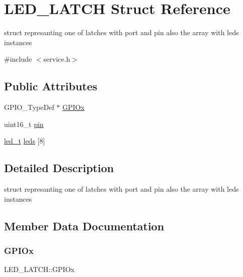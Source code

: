 \hypertarget{struct_l_e_d___l_a_t_c_h}{}\section{L\+E\+D\+\_\+\+L\+A\+T\+CH Struct Reference}
\label{struct_l_e_d___l_a_t_c_h}


struct represanting one of latches with port and pin also the array with leds instances  




{\ttfamily \#include $<$service.\+h$>$}

\subsection*{Public Attributes}
\begin{DoxyCompactItemize}
\item 
G\+P\+I\+O\+\_\+\+Type\+Def $\ast$ \mbox{\hyperlink{struct_l_e_d___l_a_t_c_h_acfc973696a9b63cbd20f71ceb42ee1df}{G\+P\+I\+Ox}}
\item 
uint16\+\_\+t \mbox{\hyperlink{struct_l_e_d___l_a_t_c_h_a2697d547dbb223948a1d20456db05bef}{pin}}
\item 
\mbox{\hyperlink{struct_l_e_d}{led\+\_\+t}} \mbox{\hyperlink{struct_l_e_d___l_a_t_c_h_a32d9a799b743577923e94ab791373192}{leds}} \mbox{[}8\mbox{]}
\end{DoxyCompactItemize}


\subsection{Detailed Description}
struct represanting one of latches with port and pin also the array with leds instances 

\subsection{Member Data Documentation}
\mbox{\label{struct_l_e_d___l_a_t_c_h_acfc973696a9b63cbd20f71ceb42ee1df}} 
\subsubsection{\texorpdfstring{G\+P\+I\+Ox}{GPIOx}}
{\footnotesize\ttfamily L\+E\+D\+\_\+\+L\+A\+T\+C\+H\+::\+G\+P\+I\+Ox}

